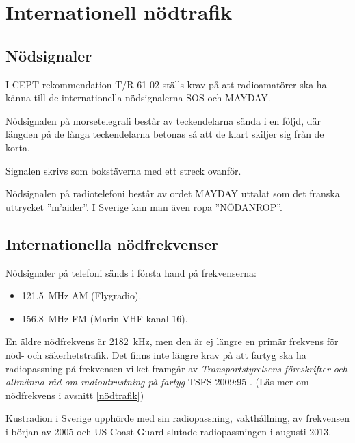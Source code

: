 \section{Internationell nödtrafik}

\subsection{Nödsignaler}

I CEPT-rekommendation T/R 61-02 \cite{TR6102} ställs krav på att radioamatörer
ska ha känna till de internationella nödsignalerna SOS och MAYDAY.

Nödsignalen på morsetelegrafi består av teckendelarna \Mcharsep\MSOS %
sända i en följd, där längden på de långa teckendelarna betonas så att de klart
skiljer sig från de korta.

Signalen skrivs som bokstäverna  med ett streck ovanför.

Nödsignalen på radiotelefoni består av ordet MAYDAY uttalat som det franska
uttrycket ''m'aider''. I Sverige kan man även ropa ''NÖDANROP''.

\subsection{Internationella nödfrekvenser}

Nödsignaler på telefoni sänds i första hand på frekvenserna:

\begin{itemize}
  \item \SI{121,5}{\mega\hertz} AM (Flygradio).
  \item \SI{156,8}{\mega\hertz} FM (Marin VHF kanal 16).
\end{itemize}

En äldre nödfrekvens är 2182~kHz, men den är ej längre en primär frekvens för
nöd- och säkerhetstrafik.
Det finns inte längre krav på att fartyg ska ha radiopassning på frekvensen
vilket framgår av \emph{Transportstyrelsens föreskrifter och allmänna råd
	om radioutrustning på fartyg} TSFS 2009:95 \cite[\S22]{TSFS2009:95}.
(Läs mer om nödfrekvens i avsnitt \ref{nödtrafik})

Kustradion i Sverige upphörde med sin radiopassning, vakthållning, av frekvensen
i början av 2005 och US Coast Guard slutade radiopassningen i augusti 2013.

